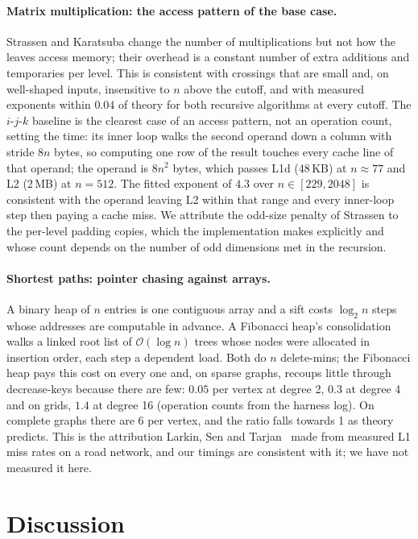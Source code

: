 \documentclass[11pt]{article}
\newcommand{\bigO}{\mathcal{O}}
\begin{document}
\paragraph{Matrix multiplication: the access pattern of the base case.}
Strassen and Karatsuba change the number of multiplications but not how the
leaves access memory; their overhead is a constant number of extra additions
and temporaries per level. This is consistent with crossings that are small
and, on well-shaped inputs, insensitive to $n$ above the cutoff, and with
measured exponents within $0.04$ of theory for both recursive algorithms at
every cutoff. The $i$-$j$-$k$ baseline is the clearest case of an access
pattern, not an operation count, setting the time: its inner loop walks the
second operand down a column with stride $8n$ bytes, so computing one row of
the result touches every cache line of that operand; the operand is $8n^2$
bytes, which passes L1d (48\,KB) at $n\approx77$ and L2 (2\,MB) at $n=512$. The fitted exponent of $4.3$ over $n\in[229,2048]$ is consistent
with the operand leaving L2 within that range and every inner-loop step then
paying a cache miss. We attribute the odd-size penalty of Strassen to the
per-level padding copies, which the implementation makes explicitly and
whose count depends on the number of odd dimensions met in the recursion.

\paragraph{Shortest paths: pointer chasing against arrays.} A binary heap of
$n$ entries is one contiguous array and a sift costs $\log_2 n$ steps whose
addresses are computable in advance. A Fibonacci heap's consolidation walks a
linked root list of $\bigO(\log n)$ trees whose nodes were allocated in
insertion order, each step a dependent load. Both do $n$ delete-mins; the
Fibonacci heap pays this cost on every one and, on sparse graphs, recoups
little through decrease-keys because there are few: $0.05$ per vertex at
degree 2, $0.3$ at degree 4 and on grids, $1.4$ at degree 16 (operation
counts from the harness log). On complete graphs there are $6$ per vertex,
and the ratio falls towards 1 as theory predicts. This is the attribution
Larkin, Sen and Tarjan~\cite{larkin2014backtobasics} made from measured L1
miss rates on a road network, and our timings are consistent with it; we
have not measured it here.

\section{Discussion}\label{sec:discussion}
\end{document}
